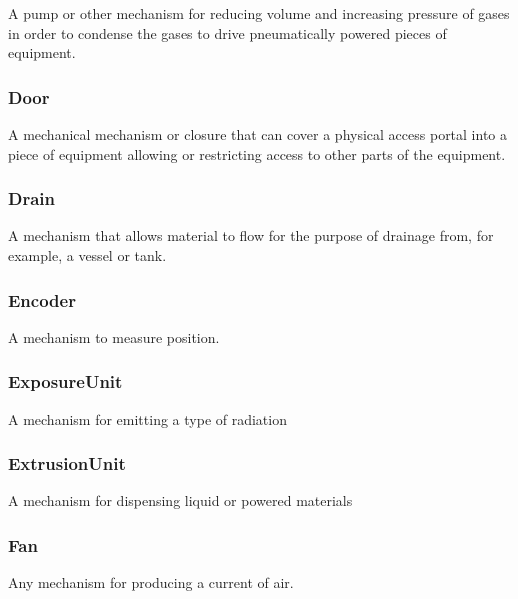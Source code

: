 A pump or other mechanism for reducing volume and increasing pressure of gases in order to condense the gases to drive pneumatically powered pieces of equipment.


\subsubsection{Door}




A mechanical mechanism or closure that can cover a physical access portal into a piece of equipment allowing or restricting access to other parts of the equipment.


\subsubsection{Drain}
\label{sec:Drain}



A mechanism that allows material to flow for the purpose of drainage from, for example, a vessel or tank.


\subsubsection{Encoder}
\label{sec:Encoder}



A mechanism to measure position.


\subsubsection{ExposureUnit}
\label{sec:ExposureUnit}



A mechanism for emitting a type of radiation


\subsubsection{ExtrusionUnit}
\label{sec:ExtrusionUnit}



A mechanism for dispensing liquid or powered materials


\subsubsection{Fan}
\label{sec:Fan}



Any mechanism for producing a current of air.


